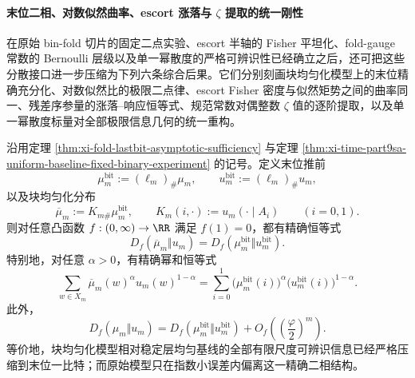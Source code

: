 \paragraph{末位二相、对数似然曲率、escort 涨落与 \texorpdfstring{$\zeta$}{zeta} 提取的统一刚性}
在原始 bin-fold 切片的固定二点实验、escort 半轴的 Fisher 平坦化、fold-gauge 常数的 Bernoulli 层级以及单一幂散度的严格可辨识性已经确立之后，还可把这些分散接口进一步压缩为下列六条综合后果。它们分别刻画块均匀化模型上的末位精确充分化、对数似然比的极限二点律、escort Fisher 密度与似然矩势之间的曲率同一、残差序参量的涨落--响应恒等式、规范常数对偶整数 \(\zeta\) 值的逐阶提取，以及单一幂散度标量对全部极限信息几何的统一重构。

\begin{theorem}\label{thm:xi-time-part9xe-block-uniformized-lastbit-exact-fdiv}
沿用定理 \ref{thm:xi-fold-lastbit-asymptotic-sufficiency} 与定理 \ref{thm:xi-time-part9sa-uniform-baseline-fixed-binary-experiment} 的记号。定义末位推前
\[
\mu_m^{\mathrm{bit}}:=(\ell_m)_\#\mu_m,
\qquad
u_m^{\mathrm{bit}}:=(\ell_m)_\#u_m,
\]
以及块均匀化分布
\[
\overline\mu_m:=K_{m\#}\mu_m^{\mathrm{bit}},
\qquad
K_m(i,\cdot):=u_m(\cdot\mid A_i)
\qquad (i=0,1).
\]
则对任意凸函数 \(f:(0,\infty)\to\RR\) 满足 \(f(1)=0\)，都有精确恒等式
\[
D_f(\overline\mu_m\Vert u_m)
=
D_f(\mu_m^{\mathrm{bit}}\Vert u_m^{\mathrm{bit}}).
\]
特别地，对任意 \(\alpha>0\)，有精确幂和恒等式
\[
\sum_{w\in X_m}\overline\mu_m(w)^\alpha u_m(w)^{1-\alpha}
=
\sum_{i=0}^{1}\bigl(\mu_m^{\mathrm{bit}}(i)\bigr)^\alpha
\bigl(u_m^{\mathrm{bit}}(i)\bigr)^{1-\alpha}.
\]
此外，
\[
D_f(\mu_m\Vert u_m)
=
D_f(\mu_m^{\mathrm{bit}}\Vert u_m^{\mathrm{bit}})
+O_f\!\left(\left(\frac{\varphi}{2}\right)^m\right).
\]
等价地，块均匀化模型相对稳定层均匀基线的全部有限尺度可辨识信息已经严格压缩到末位一比特；而原始模型只在指数小误差内偏离这一精确二相结构。
\end{theorem}
